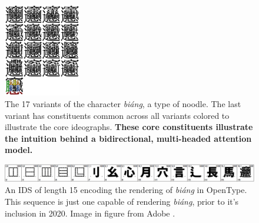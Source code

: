 \begin{figure}[h]
    \begin{center}
        \includegraphics[width=0.3\textwidth]{figures/biang-variants.png}
        \caption[The 17 variants of \textit{biáng}]{The 17 variants of the character \textit{biáng}, a type of noodle. The last variant has constituents common across all variants colored to illustrate the core ideographs. \newline\textbf{These core constituents illustrate the intuition behind a bidirectional, multi-headed attention model.}}
        \label{fig:biang}
    \end{center}
\end{figure}

\begin{figure}[t]
    \begin{center}
        \includegraphics[width=1\textwidth]{figures/ids-biang.jpg}
        \caption[Unicode Ideographic Description Sequences]{An IDS of length 15 encoding the rendering of \textit{biáng} in OpenType. This sequence is just one capable of rendering \textit{biáng}, prior to it's inclusion in 2020\cite{unicode-ids}.
            Image in figure from Adobe \cite{adobe-ids}.}
        \label{fig:biang-ids}
    \end{center}
\end{figure}
